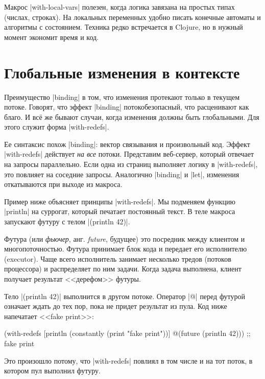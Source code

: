 Макрос \spverb|with-local-vars| полезен, когда логика завязана на простых типах
(числах, строках). На локальных переменных удобно писать конечные автоматы и
алгоритмы с состоянием. Техника редко встречается в Clojure, но в нужный момент
экономит время и код.

\section{Глобальные изменения в контексте}

\label{with-redefs}

Преимущество \spverb|binding| в том, что изменения протекают только в текущем
потоке. Говорят, что эффект \spverb|binding| потокобезопасный, что расценивают
как благо. И вс\"{е} же бывают случаи, когда изменения должны быть глобальными. Для
этого служит форма \spverb|with-redefs|.

Ее синтаксис похож \spverb|binding|: вектор связывания и произвольный
код. Эффект \spverb|with-redefs| действует \emph{на все} потоки. Представим
веб-сервер, который отвечает на запросы параллельно. Если одна из страниц
выполняет логику в \spverb|with-redefs|, это повлияет на соседние
запросы. Аналогично \spverb|binding| и \spverb|let|, изменения откатываются при
выходе из макроса.

Пример ниже объясняет принципы \spverb|with-redefs|. Мы подменяем функцию
\spverb|println| на суррогат, который печатает постоянный текст. В теле макроса
запускают футуру с телом \spverb|(println 42)|.

Футура (или \emph{фьючер}, анг. \emph{future}, будущее) это посредник между
клиентом и многопоточностью. Футура принимает блок кода и передает его
исполнителю (executor). Чаще всего исполнитель занимает несколько тредов
(потоков процессора) и распределяет по ним задачи. Когда задача выполнена,
клиент получает результат <<дерефом>> футуры.

Тело \spverb|(println 42)| выполнится в другом потоке. Оператор \spverb|@|
перед футурой означает ждать до тех пор, пока не придет результат из пула. Код
ниже напечатает <<fake print>>:

\begin{english}
  \begin{clojure}
(with-redefs
  [println (constantly (print "fake print"))]
  @(future (println 42)))
;; fake print
  \end{clojure}
\end{english}

Это произошло потому, что \spverb|with-redefs| повлиял в том числе и на тот
поток, в котором пул выполнил футуру.

